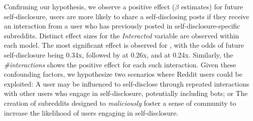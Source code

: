 Confirming our hypothesis, we observe a positive effect ($\beta$ estimates) for future self-disclosure, \ie users are more likely to share a self-disclosing posts if they receive an interaction from a user who has previously posted in self-disclosure-specific subreddits.
Distinct effect sizes for the \textit{Interacted} variable are observed within each model. 
The most significant effect is observed for \job, with the odds of future self-disclosure being 0.34x, followed by \health at 0.26x, and \relationship at 0.24x. Similarly, the \textit{\#interactions} shows the positive effect for each such interaction. 
Given these confounding factors, we hypothesize two scenarios where Reddit users could be exploited: \one A user may be influenced to self-disclose through repeated interactions with other users who engage in self-disclosure, potentially including bots; or \two The creation of subreddits designed to \textit{maliciously} foster a sense of community to increase the likelihood of users engaging in self-disclosure.


